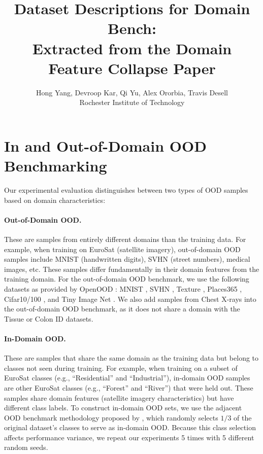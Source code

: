 \documentclass[10pt,twocolumn,letterpaper]{article}
\title{Dataset Descriptions for Domain Bench:\\Extracted from the Domain Feature Collapse Paper}
\author{Hong Yang, Devroop Kar, Qi Yu, Alex Ororbia, Travis Desell\\
Rochester Institute of Technology}
\date{}
\begin{document}
\maketitle

\section{In and Out-of-Domain OOD Benchmarking}
\label{sec:domainbench}

Our experimental evaluation distinguishes between two types of OOD samples based on domain characteristics:

\paragraph{Out-of-Domain OOD.} These are samples from entirely different domains than the training data. For example, when training on EuroSat (satellite imagery), out-of-domain OOD samples include MNIST (handwritten digits), SVHN (street numbers), medical images, etc. These samples differ fundamentally in their domain features from the training domain. For the out-of-domain OOD benchmark, we use the following datasets as provided by OpenOOD \cite{zhang2023openood}: MNIST \citep{lecun1998gradient}, SVHN \citep{netzer2011reading}, Texture \citep{cimpoi2014describing}, Places365 \citep{zhou2017places}, Cifar10/100 \citep{cifar10}, and Tiny Image Net \citep{deng2009imagenet}. We also add samples from Chest X-rays \citep{yang2023medmnist} into the out-of-domain OOD benchmark, as it does not share a domain with the Tissue or Colon ID datasets.

\paragraph{In-Domain OOD.} These are samples that share the same domain as the training data but belong to classes not seen during training. For example, when training on a subset of EuroSat classes (e.g., ``Residential'' and ``Industrial''), in-domain OOD samples are other EuroSat classes (e.g., ``Forest'' and ``River'') that were held out. These samples share domain features (satellite imagery characteristics) but have different class labels. To construct in-domain OOD sets, we use the adjacent OOD benchmark methodology proposed by \cite{yangcan}, which randomly selects $1/3$ of the original dataset's classes to serve as in-domain OOD. Because this class selection affects performance variance, we repeat our experiments 5 times with 5 different random seeds.
\end{document}
